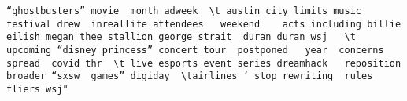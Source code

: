 \documentclass[
]{article}
\begin{document}
\begin{verbatim}
“ghostbusters” movie  month adweek  \t austin city limits music festival drew  inreallife attendees   weekend    acts including billie eilish megan thee stallion george strait  duran duran wsj   \t upcoming “disney princess” concert tour  postponed   year  concerns   spread  covid thr  \t live esports event series dreamhack   reposition    broader “sxsw  games” digiday  \tairlines ’ stop rewriting  rules  fliers wsj"                                                                                                                                                                                                                                                                                                                                                                                                                                                                                                                                                                                                                                                                                                                                                                                                                                                                                                                                                                                                                                                                                                                                                                                                                                                                                                                                                                                                                                                                                                                                                                                                                                                                                                                                                                                                                                                                                                                                                                                                                                                                                                                                                                                                                                                                                                                                                                                                                                                                                                                                                                                                                                                                                                                                                                                                                                                                                                                                                                                                                   
\end{verbatim}
\end{document}
